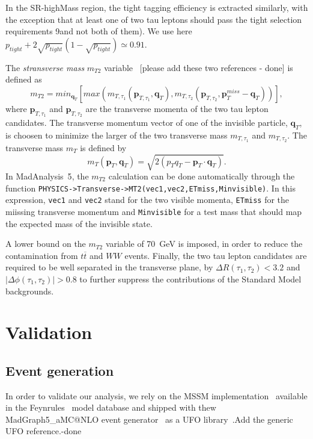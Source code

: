 \documentclass{ws-mpla}
\newcommand{\madanalysis}{{\sc MadAnalysis~5}}
\begin{document}
In the SR-highMass region, the tight tagging efficiency is extracted similarly, with the exception that at least one of two tau leptons should pass the tight selection requirements 9and not both of them). We use here $p_{tight} + 2\sqrt{p_{tight}}(1-\sqrt{p_{tight}})\simeq 0.91$.

The \textit{stransverse mass} $m_{T2}$ variable~\cite{Lester:1999tx,Cheng:2008hk} {\color{blue}[please add these two references - done]} is defined as
\begin{equation}
m_{T2} =min_{\mathbf{q}_T}
\left[
max(m_{T,\tau_1}(\mathbf{p}_{T,\tau_1},\mathbf{q}_T),m_{T,\tau_2}(\mathbf{p}_{T,\tau_2},\mathbf{p}^{miss}_T -\mathbf{q}_T))
\right],
\end{equation}   
where $\mathbf{p}_{T,\tau_1}$ and $\mathbf{p}_{T,\tau_2}$ are the transverse momenta of the two tau lepton candidates. The transverse momentum vector of one of the invisible particle, $\mathbf{q}_T$, is choosen to minimize the larger of the two transverse mass $m_{T,\tau_1}$ and $m_{T,\tau_2}$. The transverse mass $m_T$ is defined by
\begin{equation}
m_{T}(\mathbf{p}_T,\mathbf{q}_T) = \sqrt{2(p_T q_T -\mathbf{p}_T\cdot\mathbf{q}_T)}.
\end{equation} 
In \madanalysis, the $m_{T2}$ calculation can be done automatically through the function {\tt PHYSICS->Transverse->MT2(vec1,vec2,ETmiss,Minvisible)}. In this expression, {\tt vec1} and {\tt vec2} stand for the two visible momenta, {\tt ETmiss} for the miissing transverse momentum and {\tt Minvisible} for a test mass that should map the expected mass of the invisible state.

A lower bound on the $m_{T2}$ variable of 70~GeV is imposed, in order to reduce the contamination from $t\overline{t}$ and $WW$ events.
Finally, the two tau lepton candidates are required to be well separated in the transverse plane, by $\Delta R(\tau_1,\tau_2) < 3.2$ and $|\Delta\phi (\tau_1,\tau_2)| > 0.8$ to further suppress the contributions of the Standard Model backgrounds.


\section{Validation}\label{sec:val}

\subsection{Event generation}

In order to validate our analysis, we rely on the MSSM implementation~\cite{Duhr:2011se} available in the {\sc Feynrules}~\cite{Alloul:2013bka} model database and shipped with thew {\sc MadGraph5\_aMC@NLO} event generator~\cite{Alwall:2014hca} as a UFO library~\cite{Degrande:2011ua}.{\color{blue}Add the generic UFO reference.-done}
\end{document}
